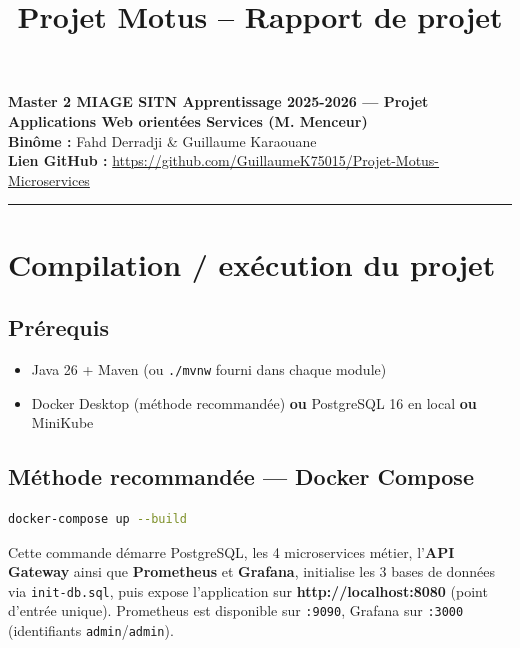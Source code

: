\documentclass[a4paper,11pt]{article}
\title{\vspace{-1.5em}\textbf{Projet Motus -- Rapport de projet}}
\author{}
\date{}
\begin{document}
\maketitle
\vspace{-3em}

\begin{center}
\textbf{Master 2 MIAGE SITN Apprentissage 2025-2026 --- Projet Applications Web orient\'ees Services (M. Menceur)}\\[0.3em]
\textbf{Bin\^ome :} Fahd Derradji \& Guillaume Karaouane\\[0.3em]
\textbf{Lien GitHub :} \url{https://github.com/GuillaumeK75015/Projet-Motus-Microservices}
\end{center}

\vspace{0.5em}
\hrule
\vspace{0.7em}

\section{Compilation / ex\'ecution du projet}

\subsection*{Pr\'erequis}
\begin{itemize}[nosep]
  \item Java 26 + Maven (ou \texttt{./mvnw} fourni dans chaque module)
  \item Docker Desktop (m\'ethode recommand\'ee) \textbf{ou} PostgreSQL 16 en local \textbf{ou} MiniKube
\end{itemize}

\subsection*{M\'ethode recommand\'ee --- Docker Compose}
\begin{lstlisting}[language=bash]
docker-compose up --build
\end{lstlisting}
Cette commande d\'emarre PostgreSQL, les 4 microservices m\'etier, l'\textbf{API Gateway} ainsi que \textbf{Prometheus} et \textbf{Grafana}, initialise les 3 bases de donn\'ees via \texttt{init-db.sql}, puis expose l'application sur \textbf{http://localhost:8080} (point d'entr\'ee unique). Prometheus est disponible sur \texttt{:9090}, Grafana sur \texttt{:3000} (identifiants \texttt{admin}/\texttt{admin}).
\end{document}
